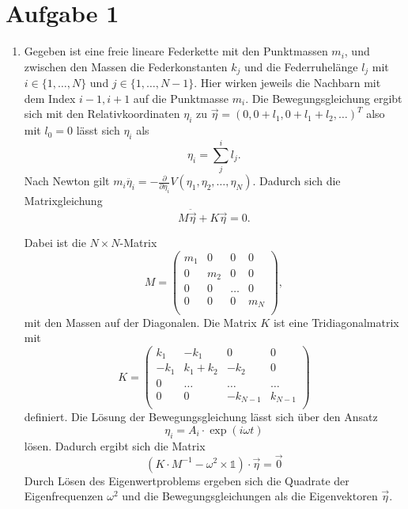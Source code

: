 \section*{Aufgabe 1}

\begin{enumerate}[label=\alph*)]

\item Gegeben ist eine freie lineare Federkette mit den Punktmassen $m_i$, und zwischen den Massen die Federkonstanten $k_j$ und die Federruhelänge $l_j$ mit $i \in \{1, \dots, N\}$ und $j \in \{1, \dots, N-1\}$.
Hier wirken jeweils die Nachbarn mit dem Index $i-1, i+1$ auf die Punktmasse $m_i$.
Die Bewegungsgleichung ergibt sich mit den 
Relativkoordinaten $\eta_i$ zu $\vec \eta = \left(0, 0+l_1, 0+ l_1 + l_2, \dots\right)^T$ also mit $l_0 = 0$ lässt sich $\eta_i$ als
\begin{equation*}
    \eta_i = \sum_j^{i} l_j.
\end{equation*}
Nach Newton gilt $m_i \ddot{\eta_i} = - \frac{\partial}{\partial \eta_i} V(\eta_1, \eta_2, \dots, \eta_N).$
Dadurch sich die Matrixgleichung 
\begin{equation*}
    M \ddot{\vec{\eta}} + K \vec{\eta} = 0.    
\end{equation*}

Dabei ist die $N \times N$-Matrix 
\begin{equation*}
    M = \begin{pmatrix*}
        m_1 &0   &0     &0 \\
        0   &m_2 &0     &0 \\
        0   &0   &\dots &0 \\
        0   &0   &0     &m_N \\
    \end{pmatrix*},
\end{equation*}
mit den Massen auf der Diagonalen. 
Die Matrix $K$ ist eine Tridiagonalmatrix mit 
\begin{equation*}
    K = \begin{pmatrix*}
        k_1 & -k_1   &0     &0 \\
        -k_1   &k_1+k_2 &-k_2     &0 \\
        0   &\dots   &\dots &\dots \\
        0   &0   &-k_{N-1}     &k_{N-1} \\
    \end{pmatrix*}
\end{equation*}
definiert. 
Die Lösung der Bewegungsgleichung lässt sich über den Ansatz
\begin{equation*}
    \eta_i = A_i \cdot \exp(i \omega t)
\end{equation*}
lösen. Dadurch ergibt sich die Matrix 
\begin{equation*}
    (K\cdot M^{-1} - \omega^2 \times \mathbb{1}) \cdot \vec \eta = \vec 0
\end{equation*}
Durch Lösen des Eigenwertproblems ergeben sich die Quadrate der Eigenfrequenzen $\omega^2$ und die Bewegungsgleichungen als die Eigenvektoren $\vec \eta$. 


\end{enumerate}
